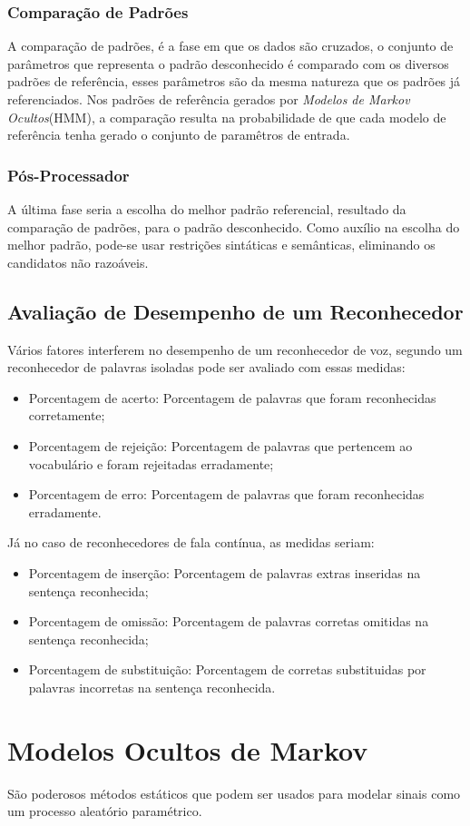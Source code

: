 \subsection{Comparação de Padrões}

A comparação de padrões, é a fase em que os dados são cruzados, o conjunto de parâmetros que representa o padrão desconhecido é comparado com os diversos padrões de referência, esses parâmetros são da mesma natureza que os padrões já referenciados. \cite{AvaliaTecJose}
Nos padrões de referência gerados por \textit{Modelos de Markov Ocultos}(HMM), a comparação resulta na probabilidade de que cada modelo de referência tenha gerado o conjunto de paramêtros de entrada. \cite{AvaliaTecJose} 


\subsection{Pós-Processador}

A última fase seria a escolha do melhor padrão referencial, resultado da comparação de padrões, para o padrão desconhecido. Como auxílio na escolha do melhor padrão, pode-se usar restrições sintáticas e semânticas, eliminando os candidatos não razoáveis. \cite{AvaliaTecJose}

\section{Avaliação de Desempenho de um Reconhecedor}
Vários fatores interferem no desempenho de um reconhecedor de voz, segundo \cite{AvaliaTecJose} um reconhecedor de palavras isoladas pode ser avaliado com essas medidas:
\begin{itemize}
\item Porcentagem de acerto: Porcentagem de palavras que foram reconhecidas corretamente;
\item Porcentagem de rejeição: Porcentagem de palavras que pertencem ao vocabulário e foram rejeitadas erradamente;
\item Porcentagem de erro: Porcentagem de palavras que foram reconhecidas erradamente.
\end{itemize}

Já no caso de reconhecedores de fala contínua, as medidas seriam\cite{AvaliaTecJose}:
\begin{itemize}
\item Porcentagem de inserção: Porcentagem de palavras extras inseridas na sentença reconhecida;
\item Porcentagem de omissão: Porcentagem de palavras corretas omitidas na sentença reconhecida;
\item Porcentagem de substituição: Porcentagem de corretas substituidas por palavras incorretas na sentença reconhecida.
\end{itemize}

\chapter{Modelos Ocultos de Markov}
São poderosos métodos estáticos que podem ser usados para modelar sinais como um processo aleatório paramétrico. 
















